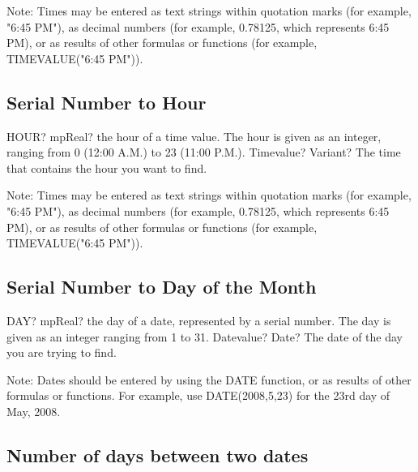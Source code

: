 \vspace{0.3cm}
Note: Times may be entered as text strings within quotation marks (for example, "6:45 PM"), as decimal numbers (for example, 0.78125, which represents 6:45 PM), or as results of other formulas or functions (for example, TIMEVALUE("6:45 PM")).



\subsection{Serial Number to Hour}

\begin{mpFunctionsExtract}
	\mpWorksheetFunctionOneNotImplemented
	{HOUR? mpReal? the hour of a time value. The hour is given as an integer, ranging from 0 (12:00 A.M.) to 23 (11:00 P.M.).}
	{Timevalue? Variant? The time that contains the hour you want to find.}
\end{mpFunctionsExtract}

\vspace{0.3cm}
Note: Times may be entered as text strings within quotation marks (for example, "6:45 PM"), as decimal numbers (for example, 0.78125, which represents 6:45 PM), or as results of other formulas or functions (for example, TIMEVALUE("6:45 PM")).



\subsection{Serial Number to Day of the Month}

\begin{mpFunctionsExtract}
	\mpWorksheetFunctionOneNotImplemented
	{DAY? mpReal? the day of a date, represented by a serial number. The day is given as an integer ranging from 1 to 31.}
	{Datevalue? Date? The date of the day you are trying to find.}
\end{mpFunctionsExtract}

\vspace{0.3cm}
Note: Dates should be entered by using the DATE function, or as results of other formulas or functions. For example, use DATE(2008,5,23) for the 23rd day of May, 2008. 




\subsection{Number of days between two dates}

